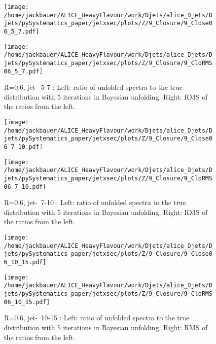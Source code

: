 \begin{figure}
\centering
\begin{minipage}{.5\textwidth}
  \centering
  \texttt{[image: /home/jackbauer/ALICE\_HeavyFlavour/work/Djets/alice\_Djets/Djets/pySystematics\_paper/jetxsec/plots/Z/9\_Closure/9\_Close06\_5\_7.pdf]}
\end{minipage}%
\begin{minipage}{.5\textwidth}
  \centering
  \texttt{[image: /home/jackbauer/ALICE\_HeavyFlavour/work/Djets/alice\_Djets/Djets/pySystematics\_paper/jetxsec/plots/Z/9\_Closure/9\_CloRMS06\_5\_7.pdf]}
\end{minipage}
  \caption{R=0.6, jet-\pt\ 5-7 \GeVc: Left: ratio of unfolded spectra to the true distribution with 5 iterations in Bayesian unfolding. Right: RMS of the ratios from the left.}
  \label{fig:UnfClosZchR06_5_7}
\end{figure}
\begin{figure}
\centering
\begin{minipage}{.5\textwidth}
  \centering
  \texttt{[image: /home/jackbauer/ALICE\_HeavyFlavour/work/Djets/alice\_Djets/Djets/pySystematics\_paper/jetxsec/plots/Z/9\_Closure/9\_Close06\_7\_10.pdf]}
\end{minipage}%
\begin{minipage}{.5\textwidth}
  \centering
  \texttt{[image: /home/jackbauer/ALICE\_HeavyFlavour/work/Djets/alice\_Djets/Djets/pySystematics\_paper/jetxsec/plots/Z/9\_Closure/9\_CloRMS06\_7\_10.pdf]}
\end{minipage}
  \caption{R=0.6, jet-\pt\ 7-10 \GeVc: Left: ratio of unfolded spectra to the true distribution with 5 iterations in Bayesian unfolding. Right: RMS of the ratios from the left.}
  \label{fig:UnfClosZchR06_7_10}
\end{figure}
\begin{figure}
\centering
\begin{minipage}{.5\textwidth}
  \centering
  \texttt{[image: /home/jackbauer/ALICE\_HeavyFlavour/work/Djets/alice\_Djets/Djets/pySystematics\_paper/jetxsec/plots/Z/9\_Closure/9\_Close06\_10\_15.pdf]}
\end{minipage}%
\begin{minipage}{.5\textwidth}
  \centering
  \texttt{[image: /home/jackbauer/ALICE\_HeavyFlavour/work/Djets/alice\_Djets/Djets/pySystematics\_paper/jetxsec/plots/Z/9\_Closure/9\_CloRMS06\_10\_15.pdf]}
\end{minipage}
  \caption{R=0.6, jet-\pt\ 10-15 \GeVc: Left: ratio of unfolded spectra to the true distribution with 5 iterations in Bayesian unfolding. Right: RMS of the ratios from the left.}
  \label{fig:UnfClosZchR06_10_15}
\end{figure}
